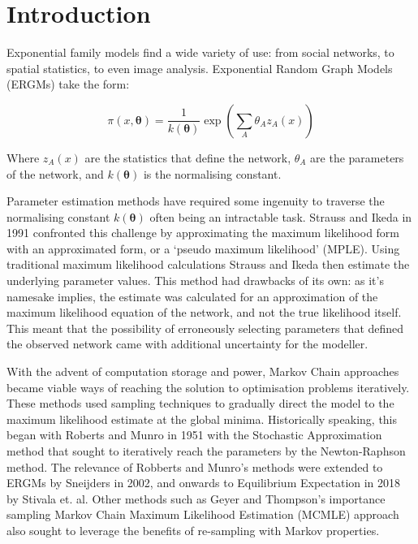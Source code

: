\section{Introduction}
\label{introduction}

Exponential family models find a wide variety of use: from social networks, to spatial statistics, to even image analysis. Exponential Random Graph Models (ERGMs) take the form:

\begin{equation}
\label{eq:ergm_form}
\pi(x, \boldsymbol{\theta}) = \frac{1}{k(\boldsymbol{\theta})}\exp{\left(\sum_A{\theta_Az_A(x)}\right)}
\end{equation}

Where $z_A(x)$ are the statistics that define the network, $\theta_A$ are the parameters of the network, and $k(\boldsymbol{\theta})$ is the normalising constant. 

Parameter estimation methods have required some ingenuity to traverse the normalising constant $k(\boldsymbol{\theta})$ often being an intractable task. Strauss and Ikeda in 1991 confronted this challenge by approximating the maximum likelihood form with an approximated form, or a `pseudo maximum likelihood' (MPLE). Using traditional maximum likelihood calculations Strauss and Ikeda then estimate the underlying parameter values. This method had drawbacks of its own: as it's namesake implies, the estimate was calculated for an approximation of the maximum likelihood equation of the network, and not the true likelihood itself. This meant that the possibility of erroneously selecting parameters that defined the observed network came with additional uncertainty for the modeller. 

With the advent of computation storage and power, Markov Chain approaches became viable ways of reaching the solution to optimisation problems iteratively. These methods used sampling techniques to gradually direct the model to the maximum likelihood estimate at the global minima. Historically speaking, this began with Roberts and Munro in 1951 with the Stochastic Approximation method that sought to iteratively reach the parameters by the Newton-Raphson method. The relevance of Robberts and Munro's methods were extended to ERGMs by Sneijders in 2002, and onwards to Equilibrium Expectation in 2018 by Stivala et. al. Other methods such as Geyer and Thompson's importance sampling Markov Chain Maximum Likelihood Estimation (MCMLE) approach also sought to leverage the benefits of re-sampling with Markov properties.


